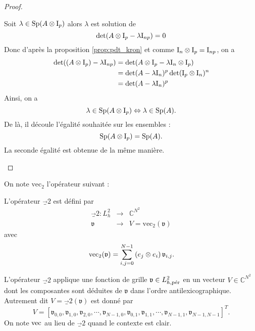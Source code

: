 \begin{proof}
\begin{itemize}
Soit $\lambda \in \Sp(A \otimes \I_p)$ alors $\lambda$ est solution de 
\begin{equation}
\det(A \otimes \I_p - \lambda \I_{np}) = 0
\end{equation}
Donc d'après la proposition \ref{prop:pdt_kron} et comme $\I_n \otimes \I_p = \I_{np}$, on a
\begin{align*}
\det((A \otimes \I_p)-\lambda \I_{np}) & = \det(A \otimes \I_p - \lambda \I_n \otimes \I_p) \\
	& = \det(A - \lambda \I_n)^p \det(\I_p \otimes \I_n)^n \\
	& = \det(A - \lambda \I_n)^p
\end{align*}
Ainsi, on a 
\begin{equation*}
\lambda \in \Sp(A\otimes \I_p) \Leftrightarrow \lambda \in \Sp(A).
\end{equation*}	
De là, il découle l'égalité souhaitée sur les ensembles :
\begin{equation}
\Sp(A \otimes \I_p) = \Sp(A).
\end{equation}
La seconde égalité est obtenue de la même manière.
\end{itemize}
\end{proof}

On note $\text{vec}_2$ l'opérateur suivant :

\begin{definition}
L'opérateur $\vec_2$ est défini par
\begin{equation}
\begin{array}{rcl}
\vec_2 : L^2_h & \longrightarrow & \mathbb{C}^{N^2}\\
\mathfrak{v} & \longrightarrow & V = \text{vec}_2(\mathfrak{v})
\end{array}
\end{equation}
avec
\begin{equation}
\text{vec}_2(\mathfrak{v}) = \gsum_{i,j=0}^{N-1} \left( e_j \otimes e_i \right)\mathfrak{v}_{i,j}.
\end{equation}
\end{definition}

L'opérateur $\vec_2$ applique une fonction de grille $\mathfrak{v} \in L^2_{h,\per}$ en un vecteur $V \in \mathbb{C}^{N^2}$ dont les composantes sont déduites de $\mathfrak{v}$ dans l'ordre antilexicographique. Autrement dit $V = \vec_2(\mathfrak{v})$ est donné par
\begin{equation}
V=[\mathfrak{v}_{0,0}, \mathfrak{v}_{1,0}, \mathfrak{v}_{2,0}, \cdots, \mathfrak{v}_{N-1,0}, \mathfrak{v}_{0,1}, \mathfrak{v}_{1,1}, \cdots,  \mathfrak{v}_{N-1,1}, \mathfrak{v}_{N-1,N-1}]^T.
\end{equation}
On note $\vec$ au lieu de $\vec_2$ quand le contexte est clair.


